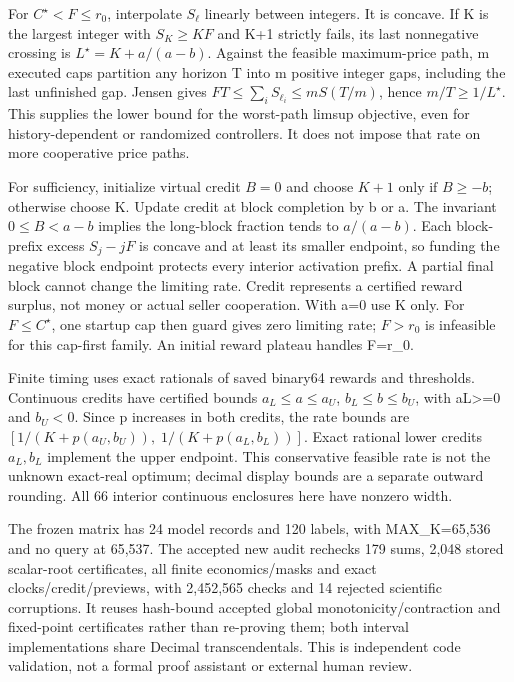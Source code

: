 \documentclass[a4paper,10pt]{article}
\begin{document}
For $C^\star<F\leq r_0$, interpolate $S_\ell$ linearly between integers. It is concave. If K is the largest integer with $S_K\geq KF$ and K+1 strictly fails, its last nonnegative crossing is $L^\star=K+a/(a-b)$. Against the feasible maximum-price path, m executed caps partition any horizon T into m positive integer gaps, including the last unfinished gap. Jensen gives $FT\leq\sum_i S_{\ell_i}\leq mS(T/m)$, hence $m/T\geq1/L^\star$. This supplies the lower bound for the worst-path limsup objective, even for history-dependent or randomized controllers. It does not impose that rate on more cooperative price paths.
\par

For sufficiency, initialize virtual credit $B=0$ and choose $K+1\text{ only if }B\geq-b$; otherwise choose K. Update credit at block completion by b or a. The invariant $0\leq B<a-b$ implies the long-block fraction tends to $a/(a-b)$. Each block-prefix excess $S_j-jF$ is concave and at least its smaller endpoint, so funding the negative block endpoint protects every interior activation prefix. A partial final block cannot change the limiting rate. Credit represents a certified reward surplus, not money or actual seller cooperation. With a=0 use K only. For $F\leq C^\star$, one startup cap then guard gives zero limiting rate; $F>r_0$ is infeasible for this cap-first family. An initial reward plateau handles F=r\_0.
\par

Finite timing uses exact rationals of saved binary64 rewards and thresholds. Continuous credits have certified bounds $a_L\leq a\leq a_U$, $b_L\leq b\leq b_U$, with aL>=0 and $b_U<0$. Since p increases in both credits, the rate bounds are $[1/(K+p(a_U,b_U)),\;1/(K+p(a_L,b_L))]$. Exact rational lower credits $a_L,b_L$ implement the upper endpoint. This conservative feasible rate is not the unknown exact-real optimum; decimal display bounds are a separate outward rounding. All 66 interior continuous enclosures here have nonzero width.
\par

The frozen matrix has 24 model records and 120 labels, with MAX\_K=65,536 and no query at 65,537. The accepted new audit rechecks 179 sums, 2,048 stored scalar-root certificates, all finite economics/masks and exact clocks/credit/previews, with 2,452,565 checks and 14 rejected scientific corruptions. It reuses hash-bound accepted global monotonicity/contraction and fixed-point certificates rather than re-proving them; both interval implementations share Decimal transcendentals. This is independent code validation, not a formal proof assistant or external human review.
\par
\end{document}
